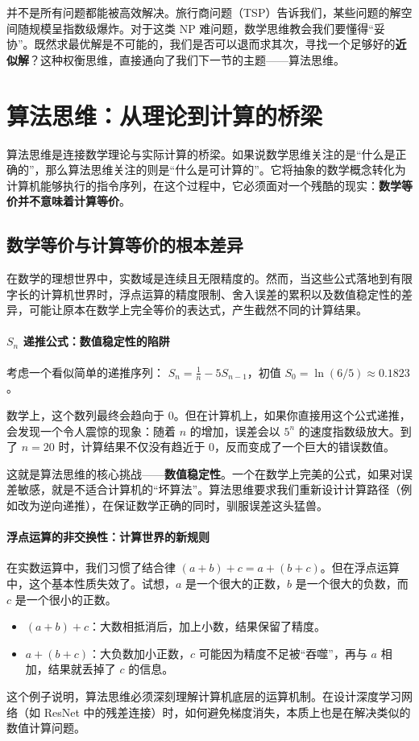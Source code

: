 并不是所有问题都能被高效解决。旅行商问题（TSP）告诉我们，某些问题的解空间随规模呈指数级爆炸。对于这类 NP 难问题，数学思维教会我们要懂得“妥协”。既然求最优解是不可能的，我们是否可以退而求其次，寻找一个足够好的\textbf{近似解}？这种权衡思维，直接通向了我们下一节的主题——算法思维。

\section{算法思维：从理论到计算的桥梁}

算法思维是连接数学理论与实际计算的桥梁。如果说数学思维关注的是“什么是正确的”，那么算法思维关注的则是“什么是可计算的”。它将抽象的数学概念转化为计算机能够执行的指令序列，在这个过程中，它必须面对一个残酷的现实：\textbf{数学等价并不意味着计算等价}。

\subsection{数学等价与计算等价的根本差异}

在数学的理想世界中，实数域是连续且无限精度的。然而，当这些公式落地到有限字长的计算机世界时，浮点运算的精度限制、舍入误差的累积以及数值稳定性的差异，可能让原本在数学上完全等价的表达式，产生截然不同的计算结果。

\paragraph{$S_n$ 递推公式：数值稳定性的陷阱}

考虑一个看似简单的递推序列：
$S_n = \frac{1}{n} - 5S_{n-1}$，初值 $S_0 = \ln(6/5) \approx 0.1823$。

数学上，这个数列最终会趋向于 $0$。但在计算机上，如果你直接用这个公式递推，会发现一个令人震惊的现象：随着 $n$ 的增加，误差会以 $5^n$ 的速度指数级放大。到了 $n=20$ 时，计算结果不仅没有趋近于 0，反而变成了一个巨大的错误数值。

这就是算法思维的核心挑战——\textbf{数值稳定性}。一个在数学上完美的公式，如果对误差敏感，就是不适合计算机的“坏算法”。算法思维要求我们重新设计计算路径（例如改为逆向递推），在保证数学正确的同时，驯服误差这头猛兽。

\paragraph{浮点运算的非交换性：计算世界的新规则}

在实数运算中，我们习惯了结合律  $(a+b)+c = a+(b+c)$。但在浮点运算中，这个基本性质失效了。试想，$a$ 是一个很大的正数，$b$ 是一个很大的负数，而 $c$ 是一个很小的正数。
\begin{itemize}
\item $(a+b)+c$：大数相抵消后，加上小数，结果保留了精度。
\item $a+(b+c)$：大负数加小正数，$c$ 可能因为精度不足被“吞噬”，再与 $a$ 相加，结果就丢掉了 $c$ 的信息。
\end{itemize}
这个例子说明，算法思维必须深刻理解计算机底层的运算机制。在设计深度学习网络（如 ResNet 中的残差连接）时，如何避免梯度消失，本质上也是在解决类似的数值计算问题。

